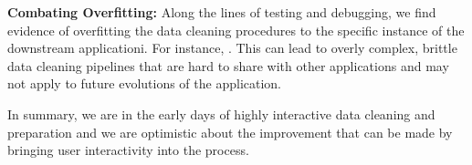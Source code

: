 
\noindent\textbf{Combating Overfitting:} Along the lines of testing and debugging, we find evidence of overfitting the data cleaning procedures to the specific instance of the downstream applicationi.  For instance, {\color{red}{EXAMPLE}}.  This can lead to overly complex, brittle data cleaning pipelines that are hard to share with other applications and may not apply to future evolutions of the application.  {\color{red}{APPLY SANJAY}}

In summary, we are in the early days of highly interactive data cleaning and preparation and we are optimistic about the improvement that can be made by bringing user interactivity into the process.


 
